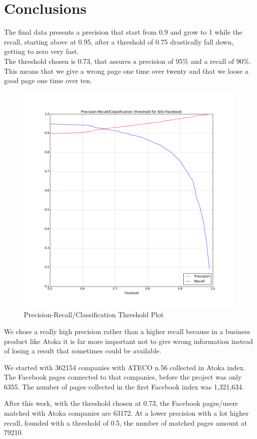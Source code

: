\chapter{Conclusions} 

The final data presents a precision that start from 0.9 and grow to 1 while the recall, starting above at 0.95, after a threshold of 0.75 drastically fall down, getting to zero very fast.\\
The threshold chosen is 0.73, that assures a precision of 95\% and a recall of 90\%. This means that we give a wrong page one time over twenty and that we loose a good page one time over ten.

\begin{figure}
\centering
    \includegraphics[width=0.5\columnwidth]{precision_recall_curve_idg_facebook.png}
    \caption{Precision-Recall/Classification Threshold Plot}
    \label{Fig.5}
\end{figure}

We chose a really high precision rather than a higher recall because in a business product like Atoka it is far more important not to give wrong information instead of losing a result that sometimes could be available.

We started with 362154 companies with ATECO n.56 collected in Atoka index. The Facebook pages connected to that companies, before the project was only 6355. The number of pages collected in the first Facebook index was 1,321,634.

After this work, with the threshold chosen at 0.73, the Facebook pages/users matched with Atoka companies are 63172. At a lower precision with a lot higher recall, founded with a threshold of 0.5, the number of matched pages amount at 79210.

